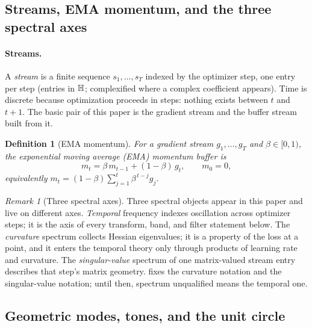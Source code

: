 \documentclass[11pt,a4paper]{article}
\newtheorem{definition}{Definition}
\theoremstyle{remark}
\newtheorem{remark}{Remark}
\begin{document}
\subsection{Streams, EMA momentum, and the three spectral axes}
\label{sec:streams}

\paragraph{Streams.} A \emph{stream} is a finite sequence $s_1,\dots,s_T$ indexed by the optimizer step, one entry per step (entries in $\mathbb{H}$; complexified where a complex coefficient appears).
Time is discrete because optimization proceeds in steps: nothing exists between $t$ and $t+1$.
The basic pair of this paper is the gradient stream and the buffer stream built from it.

\begin{definition}[EMA momentum]
\label{def:ema}
For a gradient stream $g_1,\dots,g_T$ and $\beta\in[0,1)$, the exponential moving average (EMA) momentum buffer is
\begin{equation}
\label{eq:ema}
m_t = \beta\, m_{t-1} + (1-\beta)\, g_t,\qquad m_0=0,
\end{equation}
equivalently $m_t=(1-\beta)\sum_{j=1}^{t}\beta^{\,t-j}g_j$.
\end{definition}

\begin{remark}[Three spectral axes]
\label{rem:axes}
Three spectral objects appear in this paper and live on different axes.
\emph{Temporal} frequency indexes oscillation across optimizer steps; it is the axis of every transform, band, and filter statement below.
The \emph{curvature} spectrum collects Hessian eigenvalues; it is a property of the loss at a point, and it enters the temporal theory only through products of learning rate and curvature.
The \emph{singular-value} spectrum of one matrix-valued stream entry describes that step's matrix geometry.
 fixes the curvature notation and  the singular-value notation; until then, spectrum unqualified means the temporal one.
\end{remark}

\subsection{Geometric modes, tones, and the unit circle}
\label{sec:modes}
\end{document}
